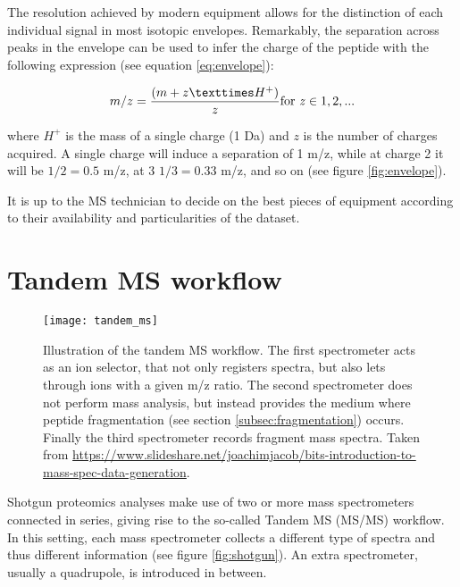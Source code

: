 The resolution achieved by modern equipment allows for the distinction of each individual signal in most isotopic envelopes. Remarkably, the separation across peaks in the envelope can be used to infer the charge of the peptide with the following expression (see equation \ref{eq:envelope}):

\begin{equation}\label{eq:envelope}
m/z = \frac{(m + z × H^+)}{z} \text{for \textit{z}} \in {1, 2,...}
\end{equation}

where $H^+$ is the mass of a single charge (1 Da) and $z$ is the number of charges acquired. A single charge will induce a separation of 1 \ac{m/z}, while at charge 2 it will be $1/2 = 0.5$ \ac{m/z}, at 3 $1/3 = 0.33$ \ac{m/z}, and so on (see figure \ref{fig:envelope}).

It is up to the \ac{MS} technician to decide on the best pieces of equipment according to their availability and particularities of the dataset.

\section{Tandem MS workflow}
\label{sec:tandem_ms_workflow}

\begin{figure}[!h]
\texttt{[image: tandem\_ms]}
\caption[MS/MS schema]{Illustration of the tandem MS workflow. The first spectrometer acts as an ion selector, that not only registers spectra, but also lets through ions with a given \ac{m/z} ratio. The second spectrometer does not perform mass analysis, but instead provides the medium where peptide fragmentation (see section \ref{subsec:fragmentation}) occurs. Finally the third spectrometer records fragment mass spectra. Taken from \href{https://www.slideshare.net/joachimjacob/bits-introduction-to-mass-spec-data-generation}{https://www.slideshare.net/joachimjacob/bits-introduction-to-mass-spec-data-generation}.}
\label{fig:tandem_ms}
\end{figure}



Shotgun proteomics analyses make use of two or more mass spectrometers connected in series, giving rise to the so-called Tandem MS (\ac{MS/MS}) workflow. In this setting, each mass spectrometer collects a different type of spectra and thus different information (see figure \ref{fig:shotgun}). An extra spectrometer, usually a quadrupole, is introduced in between.

